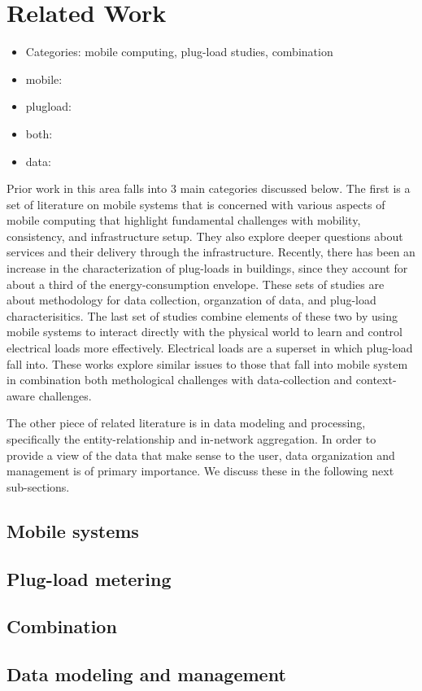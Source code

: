 \section{Related Work}


\begin{itemize}
\item Categories:  mobile computing, plug-load studies, combination
\item mobile: \cite{Caswell:2000,Kindberg00aweb,activebadge1992, Hodes}
\item plugload:  \cite{plugloadreport, taxonomy, lbnlmels}
\item both: \cite{hbci, livinglab}
\item data: \cite{Chen76theentity-relationship}
\end{itemize}

Prior work in this area falls into 3 main categories discussed below.  The first is a set of literature on 
mobile systems that is concerned with various aspects of mobile computing that highlight fundamental challenges with
mobility, consistency, and infrastructure setup.  They also explore deeper questions about services and their delivery
through the infrastructure.  Recently, there has been an increase in the characterization of plug-loads in buildings, since
they account for about a third of the energy-consumption envelope.  These sets of studies are about methodology
for data collection, organzation of data, and plug-load characterisitics.  The last set of studies combine elements
of these two by using mobile systems to interact directly with the physical world to learn and control electrical loads
more effectively.  Electrical loads are a superset in which plug-load fall into.  These works explore
similar issues to those that fall into mobile system in combination both methological challenges
with data-collection and context-aware challenges.

The other piece of related literature is in data modeling and processing, specifically the entity-relationship and
in-network aggregation.  In order to provide a view of the data that make sense
to the user, data organization and management is of primary importance.  We discuss these in the following next 
sub-sections.


\subsection{Mobile systems}

\subsection{Plug-load metering}

\subsection{Combination}

\subsection{Data modeling and management}